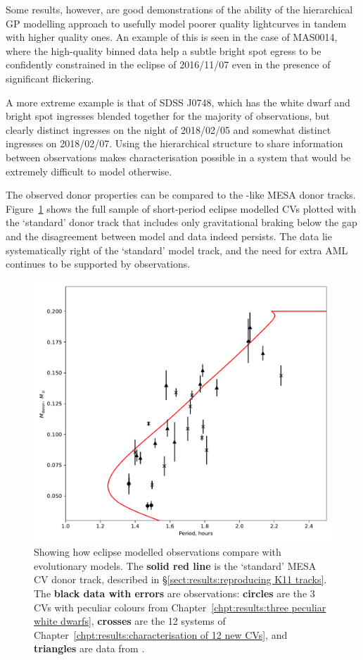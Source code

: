 Some results, however, are good demonstrations of the ability of the hierarchical GP modelling approach to usefully model poorer quality lightcurves in tandem with higher quality ones.
An example of this is seen in the case of MAS0014, where the high-quality binned data help a subtle bright spot egress to be confidently constrained in the eclipse of 2016/11/07 even in the presence of significant flickering.

A more extreme example is that of SDSS J0748, which has the white dwarf and bright spot ingresses blended together for the majority of observations, but clearly distinct ingresses on the night of 2018/02/05 and somewhat distinct ingresses on 2018/02/07.
Using the hierarchical structure to share information between observations makes characterisation possible in a system that would be extremely difficult to model otherwise.

The observed donor properties can be compared to the \citet{knigge11}-like MESA donor tracks. Figure~\ref{fig:discussion:donor model with eclipsers plotted} shows the full sample of short-period eclipse modelled CVs plotted with the `standard' donor track that includes only gravitational braking below the gap and the disagreement between model and data indeed persists. The data lie systematically right of the `standard' model track, and the need for extra AML continues to be supported by observations.
\begin{figure}
    \centering
    \includegraphics[width=\textwidth]{figures/results/K11_donor_track_with_eclipse_modelled_data.pdf}
    \caption{Showing how eclipse modelled observations compare with evolutionary models. The {\bf solid red line} is the `standard' MESA CV donor track, described in \S\ref{sect:results:reproducing K11 tracks}. The {\bf black data with errors} are observations: {\bf circles} are the 3 CVs with peculiar colours from Chapter~\ref{chpt:results:three peculiar white dwarfs}, {\bf crosses} are the 12 systems of Chapter~\ref{chpt:results:characterisation of 12 new CVs}, and {\bf triangles} are data from \citet{McAllister2019}.}
    \label{fig:discussion:donor model with eclipsers plotted}
\end{figure}

